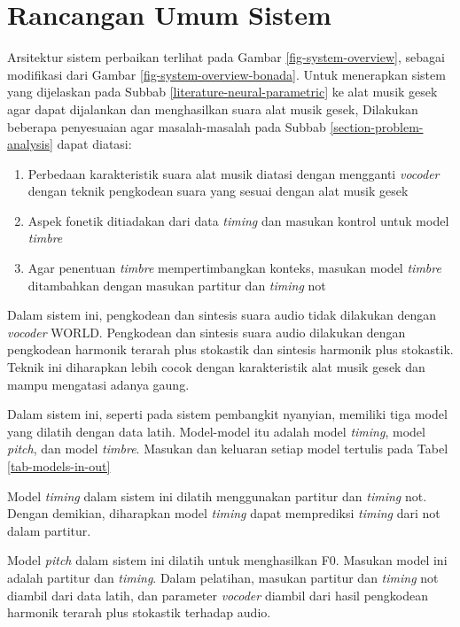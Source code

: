 \section{Rancangan Umum Sistem}

Arsitektur sistem perbaikan terlihat pada Gambar \ref{fig-system-overview}, sebagai modifikasi dari Gambar \ref{fig-system-overview-bonada}. Untuk menerapkan sistem yang dijelaskan pada Subbab \ref{literature-neural-parametric} ke alat musik gesek agar dapat dijalankan dan menghasilkan suara alat musik gesek, Dilakukan beberapa penyesuaian agar masalah-masalah pada Subbab \ref{section-problem-analysis} dapat diatasi:

\begin{enumerate}

    \item Perbedaan karakteristik suara alat musik diatasi dengan mengganti \textit{vocoder} dengan teknik pengkodean suara yang sesuai dengan alat musik gesek
    \item Aspek fonetik ditiadakan dari data \textit{timing} dan masukan kontrol untuk model \textit{timbre}
    \item Agar penentuan \textit{timbre} mempertimbangkan konteks, masukan model \textit{timbre} ditambahkan dengan masukan partitur dan \textit{timing} not

\end{enumerate}

Dalam sistem ini, pengkodean dan sintesis suara audio tidak dilakukan dengan \textit{vocoder} WORLD. Pengkodean dan sintesis suara audio dilakukan dengan pengkodean harmonik terarah plus stokastik dan sintesis harmonik plus stokastik. Teknik ini diharapkan  lebih cocok dengan karakteristik alat musik gesek dan mampu mengatasi adanya gaung.

Dalam sistem ini, seperti pada sistem pembangkit nyanyian, memiliki tiga model yang dilatih dengan data latih. Model-model itu adalah model \textit{timing}, model \textit{pitch}, dan model \textit{timbre}. Masukan dan keluaran setiap model tertulis pada Tabel \ref{tab-models-in-out}

Model \textit{timing} dalam sistem ini dilatih menggunakan partitur dan \textit{timing} not. Dengan demikian, diharapkan model \textit{timing} dapat memprediksi \textit{timing} dari not dalam partitur.

Model \textit{pitch} dalam sistem ini dilatih untuk menghasilkan F0. Masukan model ini adalah partitur dan \textit{timing}. Dalam pelatihan, masukan partitur dan \textit{timing} not diambil dari data latih, dan parameter \textit{vocoder} diambil dari hasil pengkodean harmonik terarah plus stokastik terhadap audio.

